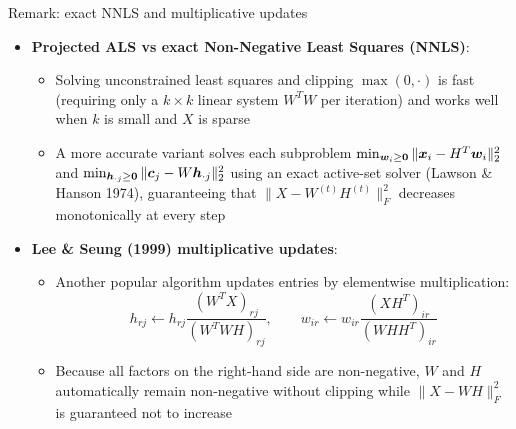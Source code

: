 \documentclass[aspectratio=169]{beamer}\usepackage[]{graphicx}\usepackage[]{xcolor}
\begin{document}
\begin{frame}{Remark: exact NNLS and multiplicative updates}
\begin{itemize}
\item \textbf{Projected ALS vs exact Non-Negative Least Squares (NNLS)}:
\begin{itemize}
\item Solving unconstrained least squares and clipping $\max(0, \cdot)$ is fast (requiring only a $k \times k$ linear system $W^T W$ per iteration) and works well when $k$ is small and $X$ is sparse
\item A more accurate variant solves each subproblem $\min_{\bw_i \ge \b0} \|\bx_i - H^T \bw_i\|_2^2$ and $\min_{\bh_{\cdot j} \ge \b0} \|\bc_j - W \bh_{\cdot j}\|_2^2$ using an exact active-set  solver (Lawson \& Hanson 1974), guaranteeing that $\|X - W^{(t)}H^{(t)}\|_F^2$ decreases monotonically at every step
\end{itemize}
\vfill
\item \textbf{Lee \& Seung (1999) multiplicative updates}:
\begin{itemize}
\item Another popular algorithm updates entries by elementwise multiplication:
\[
h_{rj} \leftarrow h_{rj} \frac{(W^T X)_{rj}}{(W^T W H)_{rj}}, \qquad
w_{ir} \leftarrow w_{ir} \frac{(X H^T)_{ir}}{(W H H^T)_{ir}}
\]
\item Because all factors on the right-hand side are non-negative, $W$ and $H$ automatically remain non-negative without clipping while $\|X - WH\|_F^2$ is guaranteed not to increase
\end{itemize}
\end{itemize}
\end{frame}
\end{document}
